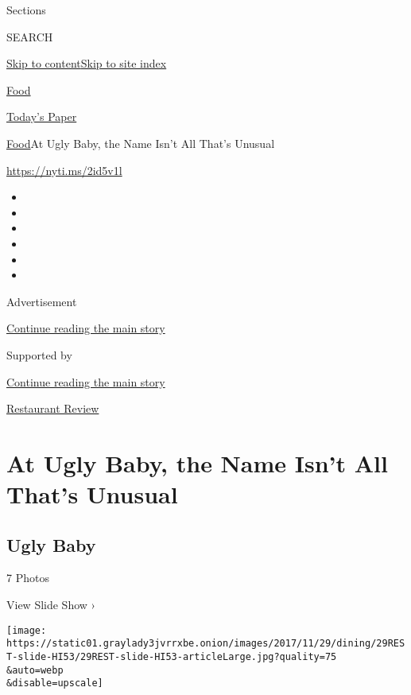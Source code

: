 Sections

SEARCH

\protect\hyperlink{site-content}{Skip to
content}\protect\hyperlink{site-index}{Skip to site index}

\href{https://www.nytimes3xbfgragh.onion/section/food}{Food}

\href{https://myaccount.nytimes3xbfgragh.onion/auth/login?response_type=cookie\&client_id=vi}{}

\href{https://www.nytimes3xbfgragh.onion/section/todayspaper}{Today's
Paper}

\href{/section/food}{Food}\textbar{}At Ugly Baby, the Name Isn't All
That's Unusual

\url{https://nyti.ms/2id5v1l}

\begin{itemize}
\item
\item
\item
\item
\item
\item
\end{itemize}

Advertisement

\protect\hyperlink{after-top}{Continue reading the main story}

Supported by

\protect\hyperlink{after-sponsor}{Continue reading the main story}

\href{/column/restaurant-review}{Restaurant Review}

\hypertarget{at-ugly-baby-the-name-isnt-all-thats-unusual}{%
\section{At Ugly Baby, the Name Isn't All That's
Unusual}\label{at-ugly-baby-the-name-isnt-all-thats-unusual}}

\href{https://www.nytimes3xbfgragh.onion/slideshow/2017/11/28/dining/ugly-baby-nyc.html}{}

\hypertarget{ugly-baby}{%
\subsection{Ugly Baby}\label{ugly-baby}}

7 Photos

View Slide Show ›

\texttt{[image: https://static01.graylady3jvrrxbe.onion/images/2017/11/29/dining/29REST-slide-HI53/29REST-slide-HI53-articleLarge.jpg?quality=75\\\&auto=webp\\\&disable=upscale]}

